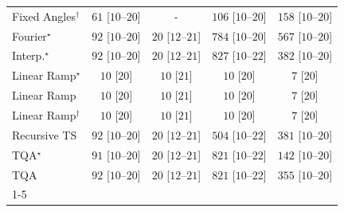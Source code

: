 \begin{tabular}{l|cccc|}
Fixed Angles$^\dagger$ & {\cellcolor[HTML]{EEF8EA}} \color[HTML]{000000} $61$ [$10$--$20$] & {\cellcolor[HTML]{000000}} \color[HTML]{F1F1F1} {\cellcolor{white}} \color{black} - & {\cellcolor[HTML]{E6F5E1}} \color[HTML]{000000} $106$ [$10$--$20$] & {\cellcolor[HTML]{D7EFD1}} \color[HTML]{000000} $158$ [$10$--$20$] \\
Fourier$^\star$ & {\cellcolor[HTML]{E8F6E4}} \color[HTML]{000000} $92$ [$10$--$20$] & {\cellcolor[HTML]{F5FBF2}} \color[HTML]{000000} $20$ [$12$--$21$] & {\cellcolor[HTML]{005522}} \color[HTML]{F1F1F1} $784$ [$10$--$20$] & {\cellcolor[HTML]{339C52}} \color[HTML]{F1F1F1} $567$ [$10$--$20$] \\
Interp.$^\star$ & {\cellcolor[HTML]{E8F6E4}} \color[HTML]{000000} $92$ [$10$--$20$] & {\cellcolor[HTML]{F5FBF2}} \color[HTML]{000000} $20$ [$12$--$21$] & {\cellcolor[HTML]{00441B}} \color[HTML]{F1F1F1} $827$ [$10$--$22$] & {\cellcolor[HTML]{83CB82}} \color[HTML]{000000} $382$ [$10$--$20$] \\
Linear Ramp$^\star$ & {\cellcolor[HTML]{F7FCF5}} \color[HTML]{000000} $10$ [$20$] & {\cellcolor[HTML]{F7FCF5}} \color[HTML]{000000} $10$ [$21$] & {\cellcolor[HTML]{F7FCF5}} \color[HTML]{000000} $10$ [$20$] & {\cellcolor[HTML]{F7FCF5}} \color[HTML]{000000} $7$ [$20$] \\
Linear Ramp & {\cellcolor[HTML]{F7FCF5}} \color[HTML]{000000} $10$ [$20$] & {\cellcolor[HTML]{F7FCF5}} \color[HTML]{000000} $10$ [$21$] & {\cellcolor[HTML]{F7FCF5}} \color[HTML]{000000} $10$ [$20$] & {\cellcolor[HTML]{F7FCF5}} \color[HTML]{000000} $7$ [$20$] \\
Linear Ramp$^\dagger$ & {\cellcolor[HTML]{F7FCF5}} \color[HTML]{000000} $10$ [$20$] & {\cellcolor[HTML]{F7FCF5}} \color[HTML]{000000} $10$ [$21$] & {\cellcolor[HTML]{F7FCF5}} \color[HTML]{000000} $10$ [$20$] & {\cellcolor[HTML]{F7FCF5}} \color[HTML]{000000} $7$ [$20$] \\
Recursive TS & {\cellcolor[HTML]{E8F6E4}} \color[HTML]{000000} $92$ [$10$--$20$] & {\cellcolor[HTML]{F5FBF2}} \color[HTML]{000000} $20$ [$12$--$21$] & {\cellcolor[HTML]{48AE60}} \color[HTML]{F1F1F1} $504$ [$10$--$22$] & {\cellcolor[HTML]{84CC83}} \color[HTML]{000000} $381$ [$10$--$20$] \\
TQA$^\star$ & {\cellcolor[HTML]{E8F6E4}} \color[HTML]{000000} $91$ [$10$--$20$] & {\cellcolor[HTML]{F5FBF2}} \color[HTML]{000000} $20$ [$12$--$21$] & {\cellcolor[HTML]{00451C}} \color[HTML]{F1F1F1} $821$ [$10$--$22$] & {\cellcolor[HTML]{DBF1D6}} \color[HTML]{000000} $142$ [$10$--$20$] \\
TQA & {\cellcolor[HTML]{E8F6E4}} \color[HTML]{000000} $92$ [$10$--$20$] & {\cellcolor[HTML]{F5FBF2}} \color[HTML]{000000} $20$ [$12$--$21$] & {\cellcolor[HTML]{00451C}} \color[HTML]{F1F1F1} $821$ [$10$--$22$] & {\cellcolor[HTML]{90D18D}} \color[HTML]{000000} $355$ [$10$--$20$] \\
\cline{1-5}
\bottomrule
\end{tabular}
